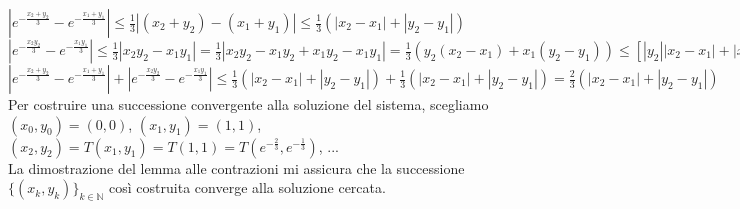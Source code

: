 \documentclass{article}
\newcommand{\N}{\mathbb{N}}
\begin{document}
$|e^{-\frac{x_2+y_2}{3}}-e^{-\frac{x_1+y_1}{3}}|\leq \frac{1}{3}|(x_2+y_2)-(x_1+y_1)| \leq \frac{1}{3} \left( |x_2-x_1|+|y_2-y_1| \right)$\\
$|e^{-\frac{x_2y_2}{3}}-e^{-\frac{x_1y_1}{3}}|\leq \frac{1}{3}|x_2y_2-x_1y_1|=\frac{1}{3}|x_2y_2-x_1y_2+x_1y_2-x_1y_1|= \frac{1}{3}\left( y_2(x_2-x_1)+x_1(y_2-y_1) \right) \leq \left[ |y_2||x_2-x_1|+|x_1||y_2-y_1| \right] \leq \frac{1}{3} (|x_2-x_1|+|y_2-y_1|)$\\
$|e^{-\frac{x_2+y_2}{3}}-e^{-\frac{x_1+y_1}{3}}|+|e^{-\frac{x_2y_2}{3}}-e^{-\frac{x_1y_1}{3}}| \leq \frac{1}{3}(|x_2-x_1|+|y_2-y_1|)+\frac{1}{3}(|x_2-x_1|+|y_2-y_1|)=\frac{2}{3}(|x_2-x_1|+|y_2-y_1|)$\\
Per costruire una successione convergente alla soluzione del sistema, scegliamo\\ $(x_0,y_0)=(0,0)$, $(x_1,y_1)=(1,1)$, $(x_2,y_2)=T(x_1,y_1)=T(1,1)=T(e^{-\frac{2}{3}},e^{-\frac{1}{3}})$, ... \\
La dimostrazione del lemma alle contrazioni mi assicura che la successione $\{(x_k,y_k)\}_{k\in\N}$ così costruita converge alla soluzione cercata.
\end{document}
